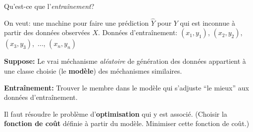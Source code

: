 

\begin{frame}{\vskip -0.3cm \Large Qu'est-ce que l'\textit{entra\^inement}?}

\scriptsize

\pause On veut: une machine
\pause pour faire une pr\'ediction $\widehat{Y}$
\pause pour $Y$ qui est inconnue
\pause \`a partir des donn\'ees observ\'ees $X$.
\;
\pause
Donn\'ees d'entra\^inement:\;
$(x_{1},y_{1})$, $(x_{2},y_{2})$, $(x_{3},y_{3})$, \,$\ldots$\;, $(x_{n},y_{n})$

\small

\pause
\vskip 0.15cm
\textbf{\large Suppose:}\;
Le vrai m\'echanisme
\textit{al\'eatoire} de g\'en\'eration des donn\'ees %
appartient \`a une classe choisie (le \textbf{\color{red}mod\`ele}) des m\'echanismes similaires.
\begin{flushleft}
\vskip -0.2cm

\end{flushleft}

\pause
\vskip -0.1cm
\textbf{\large Entra\^inement:}\;
Trouver le membre
dans le mod\`ele qui s'adjuste ``le mieux'' aux donn\'{e}es d'entra\^inement.

\pause
\begin{center}
\vskip -0.1cm
Il faut r\'{e}soudre le probl\`{e}me d'\textbf{\color{red}optimisation} qui y est associ\'{e}.
\pause
\vskip 0.0cm
{\scriptsize(Choisir la \textbf{\color{red}fonction de co\^{u}t} d\'efinie \`a partir du mod\`ele. Minimiser cette fonction de co\^{u}t.)}
\end{center}

\end{frame}
\normalsize


